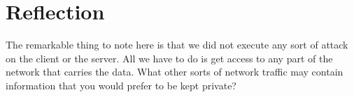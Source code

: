 \documentclass{article}
\begin{document}
\section{Reflection}
The remarkable thing to note here is that we did not execute any sort of attack on the client or the server.  All we have to do is get access to any part of the network that carries the data.  What other sorts of network traffic may contain information that you would prefer to be kept private?
\end{document}
